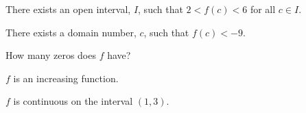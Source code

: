 \documentclass{ximera}
\begin{document}
\begin{exercise}
\begin{question}
\end{question}










\begin{question} 

There exists an open interval, $I$, such that $2 < f(c) < 6$ for all $c \in I$.
\begin{multipleChoice}
\end{multipleChoice}


\end{question}











\begin{question} 

There exists a domain number, $c$, such that $f(c) < -9$.
\begin{multipleChoice}
\end{multipleChoice}


\end{question}












\begin{question} 

How many zeros does $f$ have?
\begin{multipleChoice}
\end{multipleChoice}


\end{question}






\begin{question} 

$f$ is an increasing function.
\begin{multipleChoice}
\end{multipleChoice}


\end{question}







\begin{question} 

$f$ is continuous on the interval $(1, 3)$.
\begin{multipleChoice}
\end{multipleChoice}


\end{question}






\end{exercise}
\end{document}
